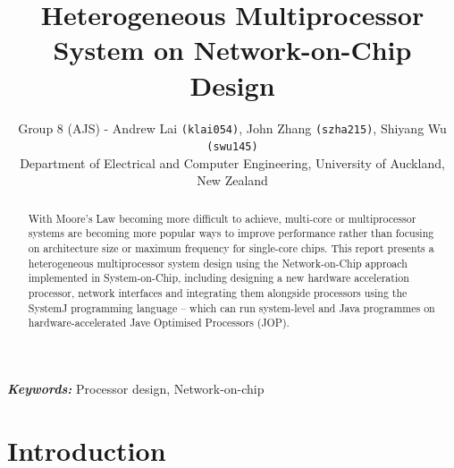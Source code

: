 \documentclass[]{article}
\providecommand{\keywords}[1]{\textbf{\textit{Keywords:}} #1}
\begin{document}
	
	\begin{titlepage}
		
	\end{titlepage}
	\tableofcontents
	\setcounter{page}{1}
	
	\title{\huge \textbf{Heterogeneous Multiprocessor System on Network-on-Chip Design}}
	\author{Group 8 (AJS) - Andrew Lai \texttt{(klai054)}, John Zhang \texttt{(szha215)}, Shiyang Wu \texttt{(swu145)} \\Department of Electrical and Computer Engineering, University of Auckland, New Zealand}
	
	\maketitle
	
	\begin{abstract}
		With Moore’s Law becoming more difficult to achieve, multi-core or multiprocessor systems are becoming more popular ways to improve performance rather than focusing on architecture size or maximum frequency for single-core chips. This report presents a heterogeneous multiprocessor system design using the Network-on-Chip approach implemented in System-on-Chip, including designing a new hardware acceleration processor, network interfaces and integrating them alongside processors using the SystemJ programming language -- which can run system-level and Java programmes on hardware-accelerated Jave Optimised Processors (JOP).
	\end{abstract}
	
	
	\keywords{Processor design, Network-on-chip}
	
	\section{Introduction}
	
\end{document}
